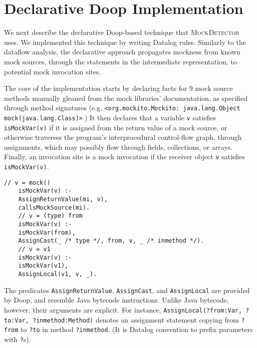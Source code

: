 
\section{Declarative Doop Implementation}
\label{sec:dec-doop}

We next describe the declarative Doop-based technique that \textsc{MockDetector} uses. We implemented this technique by writing Datalog rules. Similarly to the dataflow analysis, the declarative approach propagates mockness from known mock sources, through the statements in the intermediate representation, to potential mock invocation sites.

The core of the implementation starts by declaring facts for 9 mock source methods manually gleaned from the mock libraries' documentation, as specified through method signatures (e.g. 
\texttt{<org.mockito.Mockito: java.lang.Object mock(java.lang.Class)>}.)
It then declares that a variable {\tt v} satisfies \verb+isMockVar(v)+ if it is assigned from the return value of a mock source, or otherwise traverses the program's interprocedural control-flow graph, through assignments, which may possibly flow through fields, collections, or arrays. Finally, an invocation site is a mock invocation if the receiver object {\tt v} satisfies \verb+isMockVar(v)+.

\begin{lstlisting}[basicstyle=\ttfamily\small,numbers=none,label={lst:core}]
	// v = mock()
	isMockVar(v) :-
	AssignReturnValue(mi, v),
	callsMockSource(mi).
	// v = (type) from
	isMockVar(v) :-
	isMockVar(from),
	AssignCast(_ /* type */, from, v, _ /* inmethod */).
	// v = v1
	isMockVar(v) :-
	isMockVar(v1),
	AssignLocal(v1, v, _).
\end{lstlisting}

The predicates \texttt{AssignReturnValue}, \texttt{AssignCast}, and \texttt{AssignLocal} are provided by Doop, and resemble Java bytecode instructions. Unlike Java bytecode, however, their arguments are explicit. For instance, \texttt{AssignLocal(?from:Var, ?to:Var, ?inmethod:Method)} denotes an assignment statement copying from \texttt{?from} to \texttt{?to} in method \texttt{?inmethod}. (It is Datalog convention to prefix parameters with \texttt{?}s).

